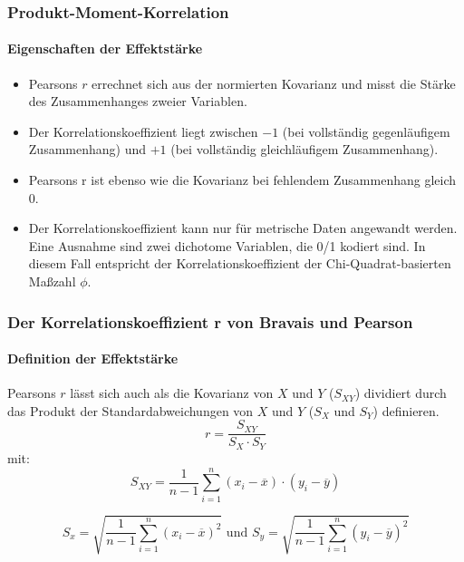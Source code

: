 \begin{frame}[shrink = 5]
  \frametitle{Produkt-Moment-Korrelation}
  \framesubtitle{Eigenschaften der Effektstärke}
  \begin{itemize}[<+->]
  \item Pearsons $r$ errechnet sich aus der normierten Kovarianz und misst die Stärke des Zusammenhanges zweier Variablen.
  \item Der Korrelationskoeffizient liegt zwischen $-1$ (bei vollständig gegenläufigem Zusammenhang) und $+1$ (bei
    vollständig gleichläufigem Zusammenhang).
  \item Pearsons r ist ebenso wie die Kovarianz bei fehlendem Zusammenhang gleich 0.
  \item Der Korrelationskoeffizient kann nur für metrische Daten angewandt werden. Eine Ausnahme sind zwei dichotome
    Variablen, die 0/1 kodiert sind. In diesem Fall entspricht der Korrelationskoeffizient der Chi-Quadrat-basierten Maßzahl $\phi$.
  \end{itemize}
\end{frame}


\begin{frame}
  \frametitle{\large{Der Korrelationskoeffizient r von Bravais und Pearson}}
  \framesubtitle{Definition der Effektstärke}
  Pearsons $r$ lässt sich auch als die Kovarianz von $X$ und $Y$ ($S_{XY}$) dividiert durch das
  Produkt der Standardabweichungen von $X$ und $Y$ ($S_X$ und $S_Y$) definieren.
  \begin{equation}
    r = \frac{S_{XY}}{S_X \cdot S_Y}
  \end{equation}
  mit:\\
  \begin{equation}
    S_{XY} = \frac{1}{n-1}\sum\limits^n_{i = 1}(x_i - \overline{x}) \cdot (y_i - \overline{y})
  \end{equation}

  \begin{equation}
    S_x = \sqrt{\frac{1}{n-1} \sum\limits^n_{i = 1} (x_i - \overline{x})^2} \text{  und  }
    S_y = \sqrt{\frac{1}{n-1} \sum\limits^n_{i = 1} (y_i - \overline{y})^2}
  \end{equation}
\end{frame}


